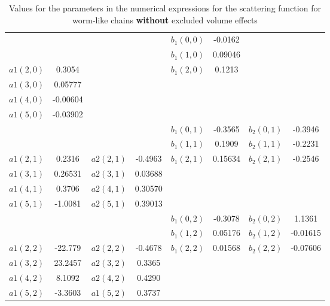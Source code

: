 \begin{table}
  \caption{Values for the parameters in the numerical expressions for the scattering function for worm-like chains \textbf{without} excluded volume effects \cite{Pedersen96Macrom}}
  \label{table:numValWMPS1noexv}
  \centering
  \begin{tabular}{l c|l c|l c|l c}
     \hline
               &          &           &          & $b_1(0,0)$ & -0.0162  &            &          \\
               &          &           &          & $b_1(1,0)$ &  0.09046 &            &          \\
     $a1(2,0)$ &  0.3054  &           &          & $b_1(2,0)$ &  0.1213  &            &          \\
     $a1(3,0)$ &  0.05777 &           &          &            &          &            &          \\
     $a1(4,0)$ & -0.00604 &           &          &            &          &            &          \\
     $a1(5,0)$ & -0.03902 &           &          &            &          &            &          \\
               &          &           &          & $b_1(0,1)$ & -0.3565  & $b_2(0,1)$ & -0.3946  \\
               &          &           &          & $b_1(1,1)$ &  0.1909  & $b_2(1,1)$ & -0.2231  \\
     $a1(2,1)$ &  0.2316  & $a2(2,1)$ & -0.4963  & $b_1(2,1)$ &  0.15634 & $b_2(2,1)$ & -0.2546  \\
     $a1(3,1)$ &  0.26531 & $a2(3,1)$ &  0.03688 &            &          &            &          \\
     $a1(4,1)$ &  0.3706  & $a2(4,1)$ &  0.30570 &            &          &            &          \\
     $a1(5,1)$ & -1.0081  & $a2(5,1)$ &  0.39013 &            &          &            &          \\
               &          &           &          & $b_1(0,2)$ & -0.3078	 & $b_2(0,2)$ &  1.1361  \\
               &          &           &          & $b_1(1,2)$ &  0.05176 & $b_2(1,2)$ & -0.01615 \\
     $a1(2,2)$ & -22.779  & $a2(2,2)$ & -0.4678  & $b_1(2,2)$ &  0.01568 & $b_2(2,2)$ & -0.07606 \\
     $a1(3,2)$ &  23.2457 & $a2(3,2)$ &  0.3365  &            &          &            &          \\
     $a1(4,2)$ &  8.1092  & $a2(4,2)$ &  0.4290  &            &          &            &          \\
     $a1(5,2)$ & -3.3603  & $a1(5,2)$ &  0.3737  &            &          &            &          \\
     \hline
   \end{tabular}
\end{table}

